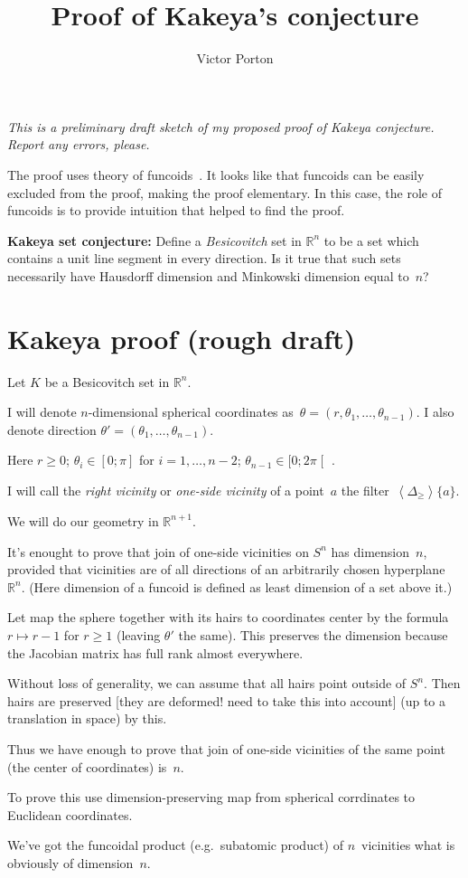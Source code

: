 \documentclass{amsart}
\title{Proof of Kakeya's conjecture}
\author{Victor Porton}
\newcommand{\supfun}[1]{\left\langle#1\right\rangle}
\begin{document}
\maketitle  

\emph{This is a preliminary draft sketch of my proposed proof of Kakeya conjecture. Report any errors, please.}

The proof uses theory of funcoids~\cite{volume-1}. It looks like that funcoids can be easily excluded from the proof, making the proof elementary. In this case, the role of funcoids is to provide intuition that helped to find the proof.

\textbf{Kakeya set conjecture:} Define a \emph{Besicovitch} set in $\mathbb{R}^n$ to be a set which contains a unit line segment in every direction. Is it true that such sets necessarily have Hausdorff dimension and Minkowski dimension equal to~$n$?

\section{Kakeya proof (rough draft)}

Let $K$ be a Besicovitch set in $\mathbb{R}^n$.

I will denote $n$-dimensional spherical coordinates as~$\theta=(r, \theta_1,\dots,\theta_{n-1})$.
I also denote direction $\theta'=(\theta_1,\dots,\theta_{n-1})$.

Here $r\geq 0$; $\theta_i\in[0;\pi]$ for $i=1,\dots,n-2$; $\theta_{n-1}\in[0;2\pi\mathclose[$ .

I will call the \emph{right vicinity} or \emph{one-si\-de vicinity} of a point~$a$ the filter~$\supfun{\Delta_{\geq}}\{a\}$.

We will do our geometry in $\mathbb{R}^{n+1}$.

It's enought to prove that join of one-si\-de vicinities on $S^n$ has dimension~$n$, provided that vicinities are of all directions
of an arbitrarily chosen hyperplane~$\mathbb{R}^n$.
(Here dimension of a funcoid is defined as least dimension of a set above it.)

Let map the sphere together with its hairs to coordinates center by the formula $r\mapsto r-1$ for $r\geq 1$ (leaving $\theta'$ the same).
This preserves the dimension because the Jacobian matrix has full rank almost everywhere.

Without loss of generality, we can assume that all hairs point outside of $S^n$. Then hairs are preserved [they are deformed! need to take this into account] (up to a translation in space) by this.

Thus we have enough to prove that join of one-si\-de vicinities of the same point (the center of coordinates) is~$n$.

To prove this use di\-men\-si\-on-pre\-ser\-ving map from spherical corrdinates to Euclidean coordinates.

We've got the funcoidal product (e.g.\ subatomic product) of $n$\ vicinities what is obviously of dimension~$n$.



\end{document}
